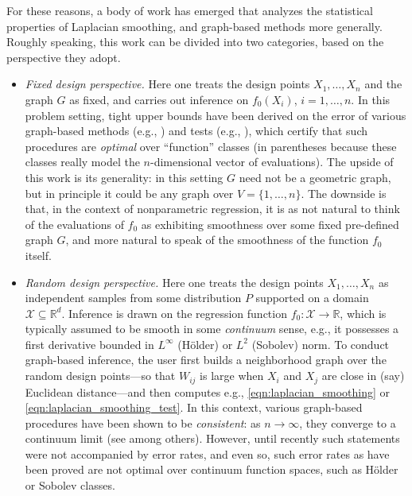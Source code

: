 \documentclass[twoside]{article}
\newcommand{\Reals}{\mathbb{R}}
\newcommand{\1}{\mathbf{1}}
\newcommand{\Rd}{\Reals^d}
\newcommand{\Xset}{\mathcal{X}}
\newcommand{\Leb}{L}
\theoremstyle{definition}
\theoremstyle{remark}
\begin{document}
For these reasons, a body of work has emerged that analyzes the statistical properties of Laplacian smoothing, and graph-based methods more generally. Roughly speaking, this work can be divided into two categories, based on the perspective they adopt. 
\begin{itemize}
	\item \emph{Fixed design perspective.} Here one treats the design points $X_1,\ldots,X_n$ and the graph $G$ as fixed, and carries out inference on $f_0(X_i)$, $i=1,\ldots,n$. In this problem setting, tight upper bounds have been derived on the error of various graph-based methods (e.g., \citet{wang2016,hutter2016,sadhanala16,sadhanala17,kirichenko2017,kirichenko2018}) and tests (e.g., \citet{sharpnack2010identifying,sharpnack2013b,sharpnack2013,sharpnack2015}), which certify that such procedures are \emph{optimal} over ``function'' classes (in parentheses because these classes really model the $n$-dimensional vector of evaluations). The upside of this work is its generality: in this setting $G$ need not be a geometric graph, but in principle it could be any graph over $V=\{1,\ldots,n\}$. The downside is that, in the context of nonparametric regression, it is as not natural to think of the evaluations of $f_0$ as exhibiting smoothness over some fixed pre-defined graph $G$, and more natural to speak of the smoothness of the function $f_0$ itself. 
	\item \emph{Random design perspective.} Here one treats the design points $X_1,\ldots,X_n$ as independent samples from some distribution $P$ supported on a domain $\Xset \subseteq \Rd$. Inference is drawn on the regression function $f_0: \Xset \to \Reals$, which is typically assumed to be smooth in some \emph{continuum} sense, e.g., it possesses a first derivative bounded in $L^{\infty}$ (H\"{o}lder) or $\Leb^2$ (Sobolev) norm. To conduct graph-based inference, the user first builds a neighborhood graph over the random design points---so that $W_{ij}$ is large when $X_i$ and $X_j$ are close in (say) Euclidean distance---and then computes e.g., \eqref{eqn:laplacian_smoothing} or \eqref{eqn:laplacian_smoothing_test}. In this context, various graph-based procedures have been shown to be \emph{consistent}: as $n \to \infty$, they converge to a continuum limit (see \citet{belkin07,vonluxburg2008,trillos2018} among others). However, until recently such statements were not accompanied by error rates, and even so, such error rates as have been proved \citep{lee2016,trillos2020} are not optimal over continuum function spaces, such as H\"{o}lder or Sobolev classes. 
\end{itemize}
\end{document}
